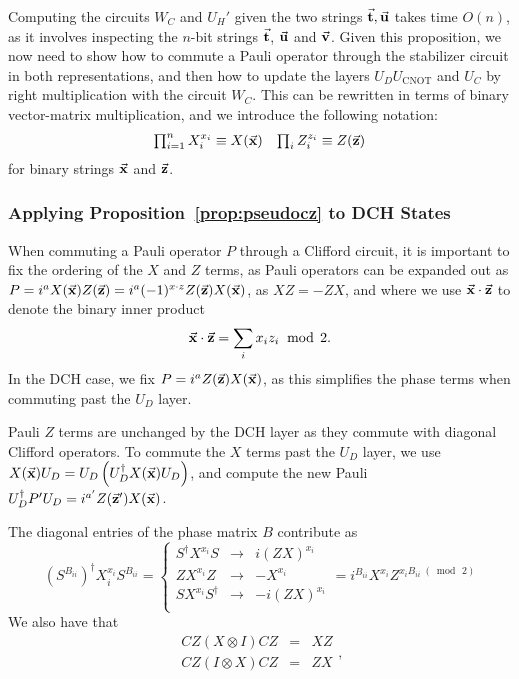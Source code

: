 Computing the circuits $W_{C}$ and $U_{H}'$ given the two strings $\va{t},\va{u}$ takes time $O(n)$, as it involves inspecting the $n$-bit strings $\va{t}$, $\va{u}$ and $\va{v}$. Given this proposition, we now need to show how to commute a Pauli operator through the stabilizer circuit in both representations, and then how to update the layers $U_{D}U_{\text{CNOT}}$ and $U_{C}$ by right multiplication with the circuit $W_{C}$. This can be rewritten in terms of binary vector-matrix multiplication, and we introduce the following notation:
\[
\begin{array}{lr}
\prod_{i=1}^{n}X_{i}^{x_{i}} \equiv X(\va{x}) & \prod_{i}Z_{i}^{z_{i}} \equiv Z(\va{z})
\end{array}
\]
for binary strings $\va{x}$ and $\va{z}$.
\subsubsection{Applying Proposition~\ref{prop:pseudocz} to DCH States}
When commuting a Pauli operator $P$ through a Clifford circuit, it is important to fix the ordering of the $X$ and $Z$ terms, as Pauli operators can be expanded out as $P=i^{a}X(\va{x})Z(\va{z}) = i^{a}(-1)^{x\cdot z}Z(\va{z})X(\va{x})$, as $XZ=-ZX$, and where we use $\va{x}\cdot \va{z}$ to denote the binary inner product
\[\va{x}\cdot \va{z} = \sum_{i}x_{i}z_{i}\;\bmod\,2.\]
In the DCH case, we fix $P=i^{a}Z(\va{z})X(\va{x})$, as this simplifies the phase terms when commuting past the $U_{D}$ layer.\par
Pauli $Z$ terms are unchanged by the DCH layer as they commute with diagonal Clifford operators. To commute the $X$ terms past the $U_{D}$ layer, we use $X(\va{x})U_{D} = U_{D}\left(U_{D}^{\dagger}X(\va{x})U_{D}\right)$, and compute the new Pauli $U_{D}^{\dagger}P'U_{D}=i^{a'}Z(\va{z}')X(\va{x})$.\par
The diagonal entries of the phase matrix $B$ contribute as
\[(S^{B_{ii}})^{\dagger} X_{i}^{x_{i}} S^{B_{ii}} = \left\{
\begin{array}{rcl}
S^{\dagger}X^{x_{i}} S & \rightarrow & i(ZX)^{x_{i}} \\
ZX^{x_{i}}Z & \rightarrow & -X^{x_{i}}\\
SX^{x_{i}}S^{\dagger} & \rightarrow & -i (ZX)^{x_{i}}\\
\end{array} = i^{B_{ii}}X^{x_{i}}Z^{x_{i}B_{ii}\;(\bmod\,2)}
\right.\]
We also have that 
\[
\begin{array}{lcr}
CZ (X\otimes I) CZ &=& XZ\\
CZ(I\otimes X)CZ &=& ZX
\end{array},\]
